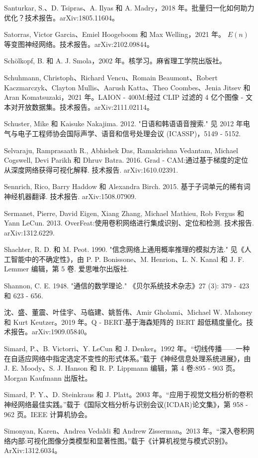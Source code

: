 \documentclass[10pt]{article}
\begin{document}
Santurkar, S.、D. Tsipras、A. Ilyas 和 A. Madry，2018 年。批量归一化如何助力优化？技术报告。arXiv:1805.11604。

Satorras, Victor Garcia、Emiel Hoogeboom 和 Max Welling，2021 年。 \(E\left( n\right)\) 等变图神经网络。技术报告。arXiv:2102.09844。

Schölkopf, B. 和 A. J. Smola，2002 年。核学习。麻省理工学院出版社。

Schuhmann, Christoph、Richard Vencu、Romain Beaumont、Robert Kaczmarczyk、Clayton Mullis、Aarush Katta、Theo Coombes、Jenia Jitsev 和 Aran Komatsuzaki，2021 年。LAION - 400M:经过 CLIP 过滤的 4 亿个图像 - 文本对开放数据集。技术报告。arXiv:2111.02114。

Schuster, Mike 和 Kaisuke Nakajima. 2012. "日语和韩语语音搜索." 见 2012 年电气与电子工程师协会国际声学、语音和信号处理会议 (ICASSP)，5149 - 5152.

Selvaraju, Ramprasaath R., Abhishek Das, Ramakrishna Vedantam, Michael Cogswell, Devi Parikh 和 Dhruv Batra. 2016. Grad - CAM:通过基于梯度的定位从深度网络获得可视化解释. 技术报告. arXiv:1610.02391.

Sennrich, Rico, Barry Haddow 和 Alexandra Birch. 2015. 基于子词单元的稀有词神经机器翻译. 技术报告. arXiv:1508.07909.

Sermanet, Pierre, David Eigen, Xiang Zhang, Michael Mathieu, Rob Fergus 和 Yann LeCun. 2013. OverFeat:使用卷积网络进行集成识别、定位和检测. 技术报告. arXiv:1312.6229.

Shachter, R. D. 和 M. Peot. 1990. "信念网络上通用概率推理的模拟方法." 见《人工智能中的不确定性》，由 P. P. Bonissone、M. Henrion、L. N. Kanal 和 J. F. Lemmer 编辑，第 5 卷. 爱思唯尔出版社.

Shannon, C. E. 1948. "通信的数学理论." 《贝尔系统技术杂志》27 (3): 379 - 423 和 623 - 656.

沈、盛、董震、叶佳宇、马临建、姚哲伟、Amir Gholami、Michael W. Mahoney 和 Kurt Keutzer。2019 年。Q - BERT:基于海森矩阵的 BERT 超低精度量化。技术报告。arXiv:1909.05840。

Simard, P.、B. Victorri、Y. LeCun 和 J. Denker。1992 年。“切线传播——一种在自适应网络中指定选定不变性的形式体系。”载于《神经信息处理系统进展》，由 J. E. Moody、S. J. Hanson 和 R. P. Lippmann 编辑，第 4 卷:895 - 903 页。Morgan Kaufmann 出版社。

Simard, P. Y.、D. Steinkraus 和 J. Platt。2003 年。“应用于视觉文档分析的卷积神经网络最佳实践。”载于《国际文档分析与识别会议(ICDAR)论文集》，第 958 - 962 页。IEEE 计算机协会。

Simonyan, Karen、Andrea Vedaldi 和 Andrew Zisserman。2013 年。“深入卷积网络内部:可视化图像分类模型和显著性图。”载于《计算机视觉与模式识别》。ArXiv:1312.6034。
\end{document}
